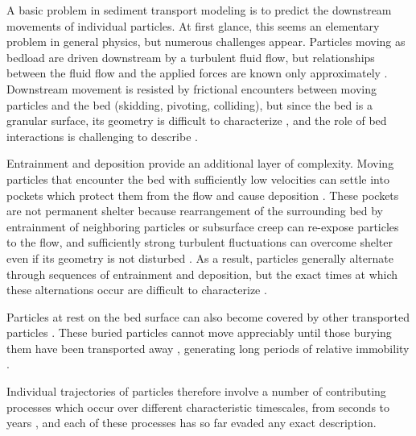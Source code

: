 A basic problem in sediment transport modeling is to predict the downstream movements of individual particles.
At first glance, this seems an elementary problem in general physics, but numerous challenges appear.
Particles moving as bedload are driven downstream by a turbulent fluid flow, but relationships between the fluid flow and the applied forces are known only approximately \citep{Michaelides1997,Schmeeckle2007}.
Downstream movement is resisted by frictional encounters between moving particles and the bed (skidding, pivoting, colliding), but since the bed is a granular surface, its geometry is difficult to characterize \citep{Gordon1972}, and the role of bed interactions is challenging to describe \citep{Sekine1992, Nino1998}.

Entrainment and deposition provide an additional layer of complexity.
Moving particles that encounter the bed with sufficiently low velocities can settle into pockets which protect them from the flow \citep{Miller1966} and cause deposition \citep{Charru2004}.
These pockets are not permanent shelter because rearrangement of the surrounding bed by entrainment of neighboring particles or subsurface creep \citep{Houssais2016,Frey2014} can re-expose particles to the flow, and sufficiently strong turbulent fluctuations \citep[e.g.][]{Cameron2020} can overcome shelter even if its geometry is not disturbed \citep{Valyrakis2010,Celik2014}. 
As a result, particles generally alternate through sequences of entrainment and deposition, but the exact times at which these alternations occur are difficult to characterize \citep{Einstein1937}.

Particles at rest on the bed surface can also become covered by other transported particles \citep{Yang1971}. 
These buried particles cannot move appreciably until those burying them have been transported away \citep{Nakagawa1981}, generating long periods of relative immobility \citep{Hassan1994,Ferguson2002}.

Individual trajectories of particles therefore involve a number of contributing processes which occur over different characteristic timescales, from seconds to years \citep{Pretzlav2021}, and each of these processes has so far evaded any exact description.

